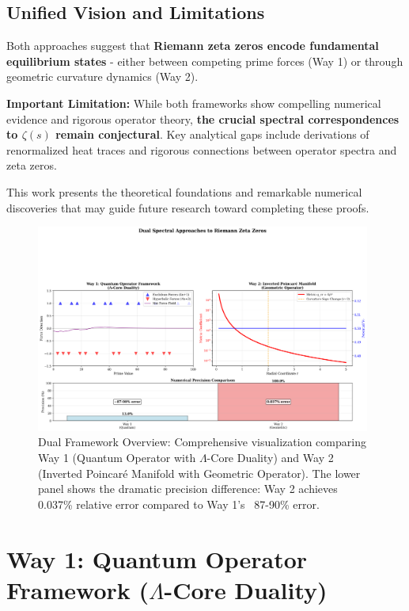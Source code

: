 \documentclass[12pt]{article}
\begin{document}
\subsection{Unified Vision and Limitations}

Both approaches suggest that \textbf{Riemann zeta zeros encode fundamental equilibrium states} - either between competing prime forces (Way 1) or through geometric curvature dynamics (Way 2).

\textbf{Important Limitation:} While both frameworks show compelling numerical evidence and rigorous operator theory, \textbf{the crucial spectral correspondences to $\zeta(s)$ remain conjectural}. Key analytical gaps include derivations of renormalized heat traces and rigorous connections between operator spectra and zeta zeros.

This work presents the theoretical foundations and remarkable numerical discoveries that may guide future research toward completing these proofs.

\begin{figure}[h]
\centering
\includegraphics[width=0.98\textwidth]{dual_framework_overview.png}
\caption{Dual Framework Overview: Comprehensive visualization comparing Way 1 (Quantum Operator with $\Lambda$-Core Duality) and Way 2 (Inverted Poincaré Manifold with Geometric Operator). The lower panel shows the dramatic precision difference: Way 2 achieves 0.037\% relative error compared to Way 1's ~87-90\% error.}
\label{fig:dual_overview}
\end{figure}

\section{Way 1: Quantum Operator Framework ($\Lambda$-Core Duality)}
\end{document}
